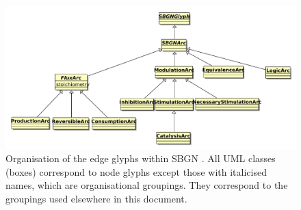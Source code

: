\begin{figure}[htb!]
\begin{center}
\includegraphics[width=\linewidth]{images/sbgn_edge_taxonomy}
\caption{Organisation of the edge glyphs within SBGN \PDl. All UML classes (boxes) correspond to \PD node glyphs except those with italicised names, which are organisational groupings. They correspond to the groupings used elsewhere in this document.}
\label{fig:sbgn_edge_tax}
\end{center}
\end{figure}

